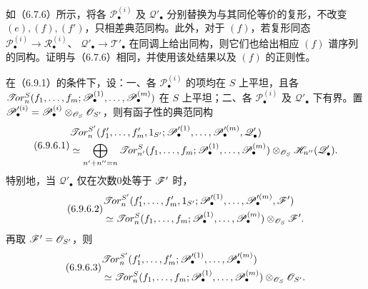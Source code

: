 如（6.7.6）所示，将各 $\mathscr P^{(i)}_\bullet$ 及 $\mathscr Q'_\bullet$ 分别替换为与其同伦等价的复形，不改变 $(e),(f),(f')$，只相差典范同构。此外，对于 $(f)$，若复形同态
$\mathscr P^{(i)}_\bullet\to\mathscr R^{(i)}_\bullet$、
$\mathscr Q'_\bullet\to\mathscr T'_\bullet$ 在同调上给出同构，则它们也给出相应 $(f)$ 谱序列的同构。证明与（6.7.6）相同，并使用该处结果以及 $(f)$ 的正则性。

在（6.9.1）的条件下，设：一、各 $\mathscr P^{(i)}_\bullet$ 的项均在 $S$ 上平坦，且各
$\mathscr{T}\!or_n^S(f_1,\ldots,f_m;\mathscr P^{(1)}_\bullet,\ldots,\mathscr P^{(m)}_\bullet)$ 在 $S$ 上平坦；二、各 $\mathscr P^{(i)}_\bullet$ 及 $\mathscr Q'_\bullet$ 下有界。置
$\mathscr P'^{(i)}_\bullet=\mathscr P^{(i)}_\bullet\otimes_{\mathscr O_S}\mathscr O_{S'}$，则有函子性的典范同构
\begin{equation}\tag{6.9.6.1}
\begin{aligned}
 &\lTor_n^{S'}(f'_1,\ldots,f'_m,1_{S'};
      \mathscr P'^{(1)}_\bullet,\ldots,\mathscr P'^{(m)}_\bullet,\mathscr Q'_\bullet)\\
 &\quad\simeq\bigoplus_{n'+n''=n}
 \lTor_{n'}^S(f_1,\ldots,f_m;
       \mathscr P^{(1)}_\bullet,\ldots,\mathscr P^{(m)}_\bullet)
          \otimes_{\OO_S}\HH_{n''}(\mathscr Q'_\bullet).
\end{aligned}
\end{equation}
特别地，当 $\mathscr Q'_\bullet$ 仅在次数0处等于 $\mathscr F'$ 时，
\begin{equation}\tag{6.9.6.2}
\begin{aligned}
 &\lTor_n^{S'}(f'_1,\ldots,f'_m,1_{S'};
     \mathscr P'^{(1)}_\bullet,\ldots,\mathscr P'^{(m)}_\bullet,\F')\\
 &\qquad\simeq\lTor_n^S(f_1,\ldots,f_m;
     \mathscr P^{(1)}_\bullet,\ldots,\mathscr P^{(m)}_\bullet)\otimes_{\OO_S}\F'.
\end{aligned}
\end{equation}
再取 $\mathscr F'=\mathscr O_{S'}$，则
\begin{equation}\tag{6.9.6.3}
\begin{aligned}
 &\lTor_n^{S'}(f'_1,\ldots,f'_m;
     \mathscr P'^{(1)}_\bullet,\ldots,\mathscr P'^{(m)}_\bullet)\\
 &\qquad\simeq\lTor_n^S(f_1,\ldots,f_m;
     \mathscr P^{(1)}_\bullet,\ldots,\mathscr P^{(m)}_\bullet)\otimes_{\OO_S}\OO_{S'}.
\end{aligned}
\end{equation}
